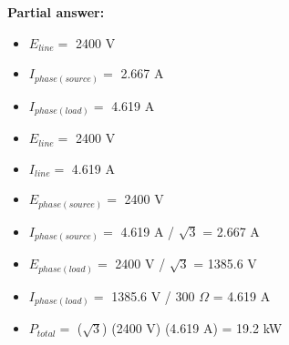 





\noindent
{\bf Partial answer:}

\begin{itemize}
\item{} $E_{line} =$ 2400 V
\item{} $I_{phase(source)} =$ 2.667 A
\item{} $I_{phase(load)} =$ 4.619 A
\end{itemize}







\begin{itemize}
\item{} $E_{line} =$ 2400 V
\item{} $I_{line} =$ 4.619 A
\item{} $E_{phase(source)} =$ 2400 V
\item{} $I_{phase(source)} =$ 4.619 A / $\sqrt{3}$ = 2.667 A
\item{} $E_{phase(load)} =$ 2400 V / $\sqrt{3}$ = 1385.6 V
\item{} $I_{phase(load)} =$ 1385.6 V / 300 $\Omega$ = 4.619 A
\item{} $P_{total} =$ ($\sqrt{3}$) (2400 V) (4.619 A) = 19.2 kW
\end{itemize}




